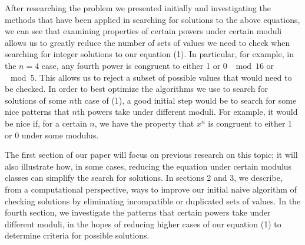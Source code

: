 \documentclass{article}
\begin{document}
\begin{flushleft}
After researching the problem we presented initially and investigating the methods that have been applied in searching for solutions to the above equations, we can see that examining properties of certain powers under certain moduli allows us to greatly reduce the number of sets of values we need to check when searching for integer solutions to our equation (1). In particular, for example, in the $n=4$ case, any fourth power is congruent to either 1 or 0 $\mod 16$ or $\mod 5$. This allows us to reject a subset of possible values that would need to be checked. In order to best optimize the algorithms we use to search for solutions of some $n$th case of (1), a good initial step would be to search for some nice patterns that $n$th powers take under different moduli. For example, it would be nice if, for a certain $n$, we have the property that $x^n$ is congruent to either 1 or 0 under some modulus. \vspace{.1in}

The first section of our paper will focus on previous research on this topic; it will also illustrate how, in some cases, reducing the equation under certain modulus classes can simplify the search for solutions. In sections 2 and 3, we describe, from a computational perspective, ways to improve our initial naive algorithm of checking solutions by eliminating incompatible or duplicated sets of values. In the fourth section, we investigate the patterns that certain powers take under different moduli, in the hopes of reducing higher cases of our equation (1) to determine criteria for possible solutions. 


\end{flushleft}
\end{document}
